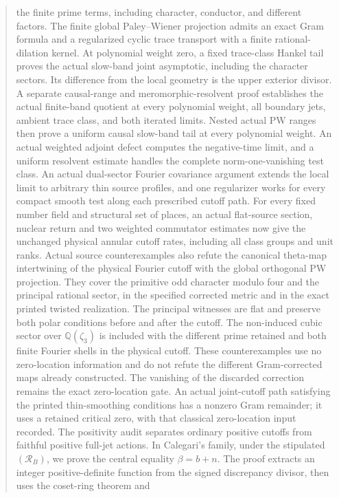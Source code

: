 \documentclass[11pt,a4paper]{article}
\begin{document}
\begin{abstract}
the finite prime terms, including character, conductor, and
different factors. The finite global Paley--Wiener projection
admits an exact Gram formula and a regularized cyclic trace
transport with a finite rational-dilation kernel. At polynomial
weight zero, a fixed trace-class Hankel tail proves the actual
slow-band joint asymptotic, including the character sectors. Its
difference from the local geometry is the upper exterior divisor.
A separate causal-range and meromorphic-resolvent proof establishes
the actual finite-band quotient at every polynomial weight, all
boundary jets, ambient trace class, and both iterated limits.
Nested actual PW ranges then prove a uniform causal slow-band
tail at every polynomial weight. An actual weighted adjoint defect
computes the negative-time limit, and a uniform resolvent estimate
handles the complete norm-one-vanishing test class. An actual dual-sector Fourier covariance argument extends the local
limit to arbitrary thin source profiles, and one regularizer works
for every compact smooth test along each prescribed cutoff path.
For every fixed number field and structural set of places, an
actual flat-source section, nuclear return and two weighted
commutator estimates now give the unchanged physical annular
cutoff rates, including all class groups and unit ranks.
Actual source counterexamples also refute the canonical theta-map
intertwining of the physical Fourier cutoff with the global
orthogonal PW projection. They cover the primitive odd character
modulo four and the principal rational sector, in the specified
corrected metric and in the exact printed twisted realization.
The principal witnesses are flat and preserve both polar conditions
before and after the cutoff. The non-induced cubic sector over
$\mathbb Q(\zeta_3)$ is included with the different prime retained
and both finite Fourier shells in the physical cutoff. These
counterexamples use no zero-location information
and do not refute the different Gram-corrected maps already constructed.
The vanishing of the discarded correction remains the exact zero-location gate. An actual joint-cutoff path
satisfying the printed thin-smoothing conditions has a nonzero
Gram remainder; it uses a retained critical zero, with that
classical zero-location input recorded. The positivity
audit separates ordinary positive cutoffs from faithful positive
full-jet actions. In Calegari's family, under the stipulated
$(\mathcal R_B)$, we prove the central equality $\beta=b+n$.
The proof extracts an integer positive-definite function from the
signed discrepancy divisor, then uses the coset-ring theorem and

\end{abstract}
\end{document}
